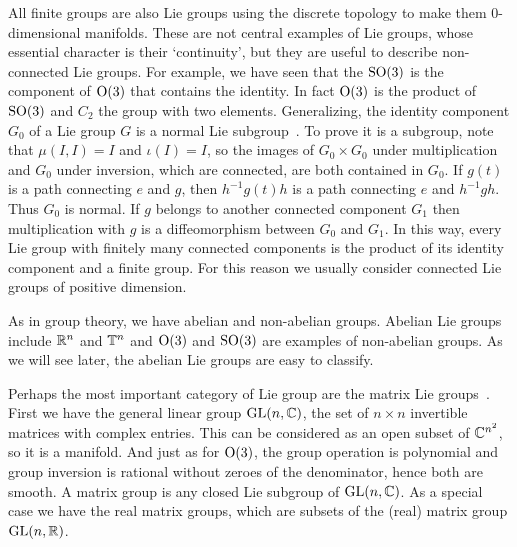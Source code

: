 All finite groups are also Lie groups using the discrete topology to make them $0$-dimensional manifolds.
These are not central examples of Lie groups, whose essential character is their `continuity', but they are useful to describe non-connected Lie groups.
For example, we have seen that the $\mathrm{SO}(3)$ is the component of $\mathrm{O}(3)$ that contains the identity.
In fact $\mathrm{O}(3)$ is the product of $\mathrm{SO}(3)$ and $C_2$ the group with two elements.
Generalizing, the identity component $G_0$ of a Lie group $G$ is a normal Lie subgroup~\cite[Prop~1.10]{Hall2015}.
To prove it is a subgroup, note that $\mu(I,I) = I$ and $\iota(I) = I$, so the images of $G_0\times G_0$ under multiplication and $G_0$ under inversion, which are connected, are both contained in $G_0$.
If $g(t)$ is a path connecting $e$ and $g$, then $h^{-1}g(t)h$ is a path connecting $e$ and $h^{-1}gh$.
Thus $G_0$ is normal.
If $g$ belongs to another connected component $G_1$ then multiplication with $g$ is a diffeomorphism between $G_0$ and $G_1$.
In this way, every Lie group with finitely many connected components is the product of its identity component and a finite group.
For this reason we usually consider connected Lie groups of positive dimension.

As in group theory, we have abelian and non-abelian groups.
Abelian Lie groups include $\mathbb{R}^n$ and $\mathbb{T}^n$ and $\mathrm{O}(3)$ and $\mathrm{SO}(3)$ are examples of non-abelian groups.
As we will see later, the abelian Lie groups are easy to classify.

Perhaps the most important category of Lie group are the matrix Lie groups~\cite[Definition~1.4]{Hall2015}.
First we have the general linear group $\mathrm{GL}(n,\mathbb{C})$, the set of $n\times n$ invertible matrices with complex entries.
This can be considered as an open subset of $\mathbb{C}^{n^2}$, so it is a manifold. And just as for $\mathrm{O}(3)$, the group operation is polynomial and group inversion is rational without zeroes of the denominator, hence both are smooth.
A matrix group is any closed Lie subgroup of $\mathrm{GL}(n,\mathbb{C})$.
As a special case we have the real matrix groups, which are subsets of the (real) matrix group $\mathrm{GL}(n,\mathbb{R})$.

